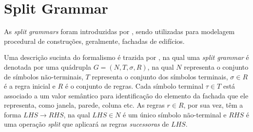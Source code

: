 \newpage

\begin{figure}[h!]
	\centering
	\captionsetup{width=15cm}
	{}	
\end{figure}

\section{Split Grammar}
\label{sec:split_grammar}

As \textit{split grammars} foram introduzidas por , sendo utilizadas para modelagem procedural de construções, geralmente, fachadas de edifícios.

Uma descrição sucinta do formalismo é trazida por , na qual uma \textit{split grammar} é denotada por uma quádrupla $G = (N, T, \sigma , R)$, na qual $N$ representa o conjunto de símbolos não-terminais, $T$ representa o conjunto dos símbolos terminais, $\sigma \in R$ é a regra inicial e $R$ é o conjunto de regras. Cada símbolo terminal $\tau \in T$ está associado a um valor semântico para identificação do elemento da fachada que ele representa, como janela, parede, coluna etc. As regras $r \in R$, por sua vez, têm a forma $LHS \rightarrow RHS$, na qual $LHS \in N$ é um único símbolo não-terminal e $RHS$ é uma operação \textit{split} que aplicará as regras \textit{sucessoras} de $LHS$. 

